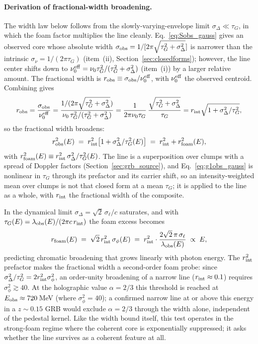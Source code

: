 \documentclass[aps,prd,onecolumn,amsmath,amssymb]{revtex4-2}
\begin{document}
\paragraph{Derivation of fractional-width broadening.}
The width law below follows from the slowly-varying-envelope limit
$\sigma_\Delta\ll\tau_G$, in which the foam factor multiplies the line
cleanly.
Eq.~\eqref{eq:Sobs_gauss} gives an observed core whose absolute width
$\sigma_{\rm obs}=1/[2\pi\sqrt{\tau_G^2+\sigma_\Delta^2}]$ is
narrower than the intrinsic $\sigma_\nu=1/(2\pi\tau_G)$
(item~(ii), Section~\ref{sec:closedforms}); however, the line center
shifts down to $\nu_0^{\rm eff}=\nu_0\tau_G^2/(\tau_G^2+\sigma_\Delta^2)$
(item~(i)) by a larger relative amount.
The fractional width is
$r_{\rm obs}\equiv\sigma_{\rm obs}/\nu_0^{\rm eff}$, with
$\nu_0^{\rm eff}$ the observed centroid.  Combining gives
\begin{equation}
  r_{\rm obs} = \frac{\sigma_{\rm obs}}{\nu_0^{\rm eff}}
  = \frac{1/(2\pi\sqrt{\tau_G^2+\sigma_\Delta^2})}
         {\nu_0\,\tau_G^2/(\tau_G^2+\sigma_\Delta^2)}
  = \frac{1}{2\pi\nu_0\tau_G}\,\frac{\sqrt{\tau_G^2+\sigma_\Delta^2}}{\tau_G}
  = r_{\rm int}\sqrt{1+\sigma_\Delta^2/\tau_G^2},
\end{equation}
so the fractional width broadens:
\begin{equation}
  r_{\rm obs}^2(E) \;=\; r_{\rm int}^2\bigl[1+\sigma_\Delta^2/\tau_G^2(E)\bigr]
                  \;=\; r_{\rm int}^2 + r_{\rm foam}^2(E),
  \label{eq:robs_decomp_width}
\end{equation}
with $r_{\rm foam}^2(E)\equiv r_{\rm int}^2\,\sigma_\Delta^2/\tau_G^2(E)$.
The line is a superposition over clumps with a spread of Doppler
factors (Section~\ref{sec:grb_source}), and Eq.~\eqref{eq:g1obs_gauss} is
nonlinear in $\tau_G$ through its prefactor and its carrier shift, so an
intensity-weighted mean over clumps is not that closed form at a mean
$\tau_G$; it is applied to the line as a whole, with $r_{\rm int}$ the
fractional width of the composite.

In the dynamical limit $\sigma_\Delta=\sqrt2\,\sigma_\ell/c$ saturates,
and with $\tau_G(E)=\lambda_{\rm obs}(E)/(2\pi c\,r_{\rm int})$ the foam
excess becomes
\begin{equation}
  r_{\rm foam}(E)
  \;=\; \sqrt{2}\,r_{\rm int}^2\,\sigma_\phi(E)
  \;=\; r_{\rm int}^2\cdot\frac{2\sqrt{2}\,\pi\,\sigma_\ell}{\lambda_{\rm obs}(E)}
  \;\propto\; E,
  \label{eq:rfoam_dyn}
\end{equation}
predicting chromatic broadening that grows linearly with photon energy.
The $r_{\rm int}^2$ prefactor makes the fractional width a
second-order foam probe: since
$\sigma_\Delta^2/\tau_G^2=2r_{\rm int}^2\sigma_\phi^2$, an order-unity
broadening of a narrow line ($r_{\rm int}\approx0.1$) requires
$\sigma_\phi^2\gtrsim40$.  At the holographic value $\alpha=2/3$ this
threshold is reached at $E_{\rm obs}\approx720$\,MeV (where
$\sigma_\phi^2=40$); a confirmed narrow line at or above this energy in a
$z\sim0.15$ GRB would exclude $\alpha=2/3$ through the width alone,
independent of the pedestal kernel.  Like the width bound itself, this
test operates in the strong-foam regime where the coherent core is
exponentially suppressed; it asks whether the line survives as a coherent
feature at all.
\end{document}
